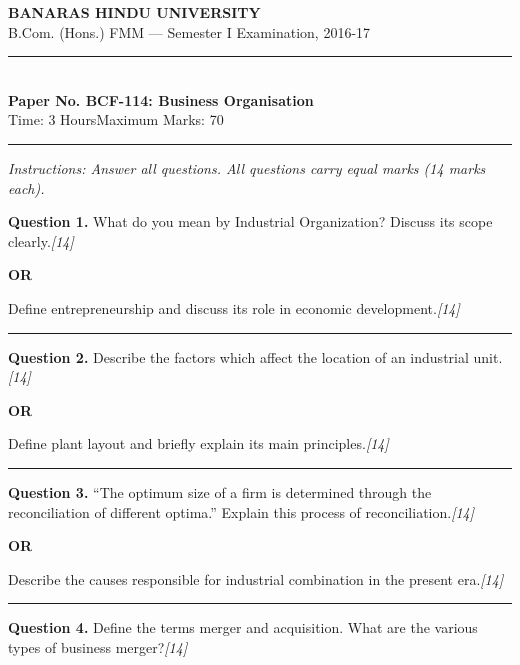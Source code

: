 \documentclass[11pt,a4paper]{article}
\newcommand{\pts}[1]{\hfill   \textit{[#1]}}
\begin{document}
\begin{center}
  {\large\bfseries BANARAS HINDU UNIVERSITY}\\[2pt]
  {\normalsize B.Com. (Hons.) FMM --- Semester I Examination, 2016-17}\\[6pt]
  \rule{0.8\linewidth}{0.5pt}\\[6pt]
  {\large\bfseries Paper No. BCF-114: Business Organisation}\\[4pt]
  {\normalsize Time: 3 Hours\hfill Maximum Marks: 70}
\end{center}

\rule{\linewidth}{0.4pt}

\smallskip



\noindent   \textit{Instructions: Answer all questions. All questions carry equal marks (14 marks each).}

\bigskip




\noindent   \textbf{Question 1.}
What do you mean by Industrial Organization? Discuss its scope clearly.\pts{14}

\centerline{   \textbf{OR}}

Define entrepreneurship and discuss its role in economic development.\pts{14}

\medskip\rule{\linewidth}{0.2pt}




\noindent   \textbf{Question 2.}
Describe the factors which affect the location of an industrial unit.\pts{14}

\centerline{   \textbf{OR}}

Define plant layout and briefly explain its main principles.\pts{14}

\medskip\rule{\linewidth}{0.2pt}




\noindent   \textbf{Question 3.}
``The optimum size of a firm is determined through the reconciliation of different optima.'' Explain this process of reconciliation.\pts{14}

\centerline{   \textbf{OR}}

Describe the causes responsible for industrial combination in the present era.\pts{14}

\medskip\rule{\linewidth}{0.2pt}




\noindent   \textbf{Question 4.}
Define the terms merger and acquisition. What are the various types of business merger?\pts{14}
\end{document}

